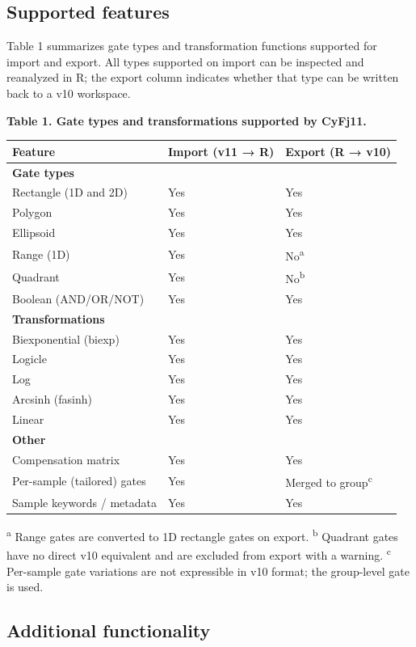 \documentclass[
]{article}
\begin{document}
\subsection{Supported features}\label{supported-features}

Table 1 summarizes gate types and transformation functions supported for
import and export. All types supported on import can be inspected and
reanalyzed in R; the export column indicates whether that type can be
written back to a v10 workspace.

\textbf{Table 1. Gate types and transformations supported by CyFj11.}

\begin{longtable}[]{@{}lll@{}}
\toprule\noalign{}
Feature & Import (v11 → R) & Export (R → v10) \\
\midrule\noalign{}
\endhead
\bottomrule\noalign{}
\endlastfoot
\textbf{Gate types} & & \\
Rectangle (1D and 2D) & Yes & Yes \\
Polygon & Yes & Yes \\
Ellipsoid & Yes & Yes \\
Range (1D) & Yes & No\textsuperscript{a} \\
Quadrant & Yes & No\textsuperscript{b} \\
Boolean (AND/OR/NOT) & Yes & Yes \\
\textbf{Transformations} & & \\
Biexponential (biexp) & Yes & Yes \\
Logicle & Yes & Yes \\
Log & Yes & Yes \\
Arcsinh (fasinh) & Yes & Yes \\
Linear & Yes & Yes \\
\textbf{Other} & & \\
Compensation matrix & Yes & Yes \\
Per-sample (tailored) gates & Yes & Merged to
group\textsuperscript{c} \\
Sample keywords / metadata & Yes & Yes \\
\end{longtable}

\textsuperscript{a} Range gates are converted to 1D rectangle gates on
export. \textsuperscript{b} Quadrant gates have no direct v10 equivalent
and are excluded from export with a warning. \textsuperscript{c}
Per-sample gate variations are not expressible in v10 format; the
group-level gate is used.

\subsection{Additional functionality}\label{additional-functionality}
\end{document}
